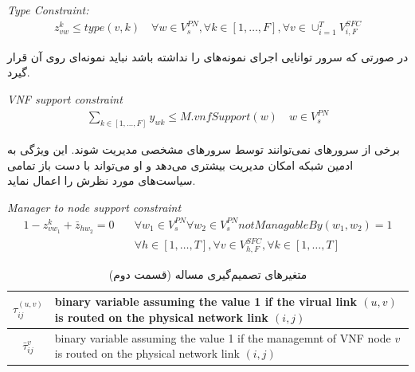 \begin{latin}
    \textit{Type Constraint:}
    \begin{align}
        z_{vw}^{k} \le type(v, k)
        \quad
        \forall w \in V_{s}^{PN},
        \forall k \in [1,\ldots, F],
        \forall v \in \cup_{i=1}^T V_{i, F}^{SFC}
    \end{align}
\end{latin}

در صورتی که سرور 
توانایی اجرای نمونه‌های 
را نداشته باشد نباید نمونه‌ای روی آن قرار گیرد.

\begin{latin}
    \textit{VNF support constraint}
    \begin{align}
        \sum_{k \in [1, \dots, F]} y_{wk} \le M . vnfSupport(w)
        \quad
        w \in V_{s}^{PN}
    \end{align}
\end{latin}

برخی از سرورهای نمی‌توانند توسط سرورهای مشخصی مدیریت شوند.
این ویژگی به ادمین شبکه امکان مدیریت بیشتری می‌دهد و او می‌تواند با دست باز تمامی
سیاست‌های مورد نظرش را اعمال نماید.

\begin{latin}
    \textit{Manager to node support constraint}
    \begin{align}
        1 - z_{vw_1}^k + \bar{z}_{hw_2} = 0
        \quad
        & \forall w_1 \in V_s^{PN} \forall w_2 \in V_s^{PN} notManagableBy(w_1, w_2) = 1 \nonumber \\
        & \forall h \in [1,\dots,T],
        \forall v \in V_{h,F}^{SFC},
        \forall k \in [1,\dots,T]
    \end{align}
\end{latin}

\begin{table}[h!]
    \vspace{0.5cm}
    \caption{متغیرهای تصمیم‌گیری مساله (قسمت دوم)}
    \begin{center}\begin{latin}\begin{tabular}{|c|p{10cm}|}
    \hline
    \(\tau^{(u,v)}_{ij}\) & binary variable assuming the value 1 if the virual link \((u,v)\) is routed on the physical network link \((i,j)\) \\
    \hline
    \(\bar{\tau}^{v}_{ij}\) & binary variable assuming the value 1 if the managemnt of VNF node $v$ is routed on the physical network link \((i,j)\) \\
    \hline
    \end{tabular}\end{latin}\end{center}
\end{table}

